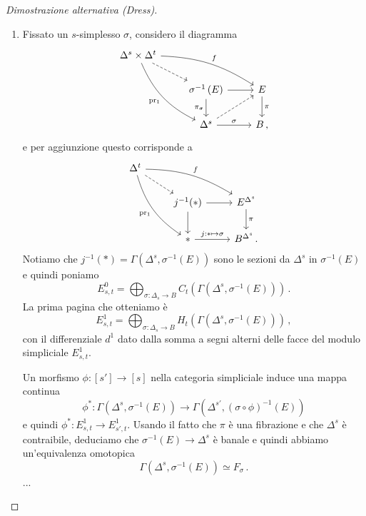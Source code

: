\begin{proof}[Dimostrazione alternativa (Dress)]
\begin{enumerate}
			\item Fissato un $s$-simplesso $\sigma$, considero il diagramma
			\begin{equation*}
			\begin{tikzcd}
				\Delta^{s} \times \Delta^{t} \ar[dr, dashed] \ar[rrd, "f", bend left=15pt] 
				\ar[ddr, "\mathrm{pr_{1}}"', bend right=20pt] & & \\
				& \sigma^{-1}\left( E \right) \ar[d, "\pi_{\sigma}"'] \ar[r] & E \ar[d, "\pi"] \\
				& \Delta^{s} \ar[ur, dashed] \ar[r, "\sigma"] & B\,,
			\end{tikzcd}
			\end{equation*}
			e per aggiunzione questo corrisponde a 
			\begin{equation*}
			\begin{tikzcd}
				\Delta^{t} \ar[dr, dashed] \ar[rrd, "f", bend left=15pt] 
				\ar[ddr, "\mathrm{pr_{1}}"', bend right=20pt] & & \\
				& j^{-1}(\ast) \ar[d] \ar[r] & E^{\Delta^{s}} \ar[d, "\pi"] \\
				& \ast \ar[r, "j:\ast \mapsto \sigma"] & B^{\Delta^{s}}\,.
			\end{tikzcd}
			\end{equation*}
			Notiamo che $j^{-1}(\ast) = \Gamma(\Delta^{s},\sigma^{-1}(E))$
			sono le sezioni da $\Delta^{s}$ in $\sigma^{-1}(E)$
			e quindi poniamo
			\begin{equation*}
				E^{0}_{s,t} = \bigoplus_{\sigma : \Delta_{s} \to B} 
				C_{t}\left( \Gamma(\Delta^{s},\sigma^{-1}(E)) \right)\,.
			\end{equation*}
			La prima pagina che otteniamo è
			\begin{equation*}
				E^{1}_{s,t} = \bigoplus_{\sigma : \Delta_{s} \to B} 
				H_{t}\left( \Gamma(\Delta^{s},\sigma^{-1}(E)) \right)\,,
			\end{equation*}
			con il differenziale $d^{1}$ dato dalla somma a segni alterni
			delle facce del modulo simpliciale $E^{1}_{s,t}$.
			
			Un morfismo $\phi : [s'] \to [s]$ nella categoria simpliciale
			induce una mappa continua
			\begin{equation*}
				\phi^{*} : \Gamma(\Delta^{s},\sigma^{-1}(E))
				\longrightarrow \Gamma(\Delta^{s'},(\sigma \circ \phi)^{-1}(E))
			\end{equation*}
			e quindi $\phi^{*}:E^{1}_{s,t} \to E^{1}_{s',t}$.
			Usando il fatto che $\pi$ è una fibrazione e che $\Delta^{s}$
			è contraibile, deduciamo che $\sigma^{-1}(E) \to \Delta^{s}$
			è banale e quindi abbiamo un'equivalenza omotopica
			\begin{equation*}
				\Gamma(\Delta^{s}, \sigma^{-1}(E)) \simeq F_{\sigma}\,.
			\end{equation*}
			...
		 \end{enumerate}
	\end{proof}